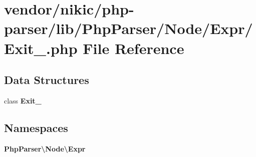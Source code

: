 \section{vendor/nikic/php-\/parser/lib/\+Php\+Parser/\+Node/\+Expr/\+Exit\+\_\+.php File Reference}
\label{_exit___8php}
\subsection*{Data Structures}
\begin{DoxyCompactItemize}
\item 
class {\bf Exit\+\_\+}
\end{DoxyCompactItemize}
\subsection*{Namespaces}
\begin{DoxyCompactItemize}
\item 
 {\bf Php\+Parser\textbackslash{}\+Node\textbackslash{}\+Expr}
\end{DoxyCompactItemize}
